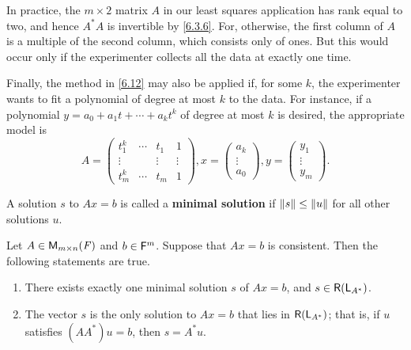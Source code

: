 \begin{note}
  In practice, the \(m \times 2\) matrix \(A\) in our least squares application has rank equal to two, and hence \(A^* A\) is invertible by \cref{6.3.6}.
  For, otherwise, the first column of \(A\) is a multiple of the second column, which consists only of ones.
  But this would occur only if the experimenter collects all the data at exactly one time.

  Finally, the method in \cref{6.12} may also be applied if, for some \(k\), the experimenter wants to fit a polynomial of degree at most \(k\) to the data.
  For instance, if a polynomial \(y = a_0 + a_1 t + \cdots + a_k t^k\) of degree at most \(k\) is desired, the appropriate model is
  \[
    A = \begin{pmatrix}
      t_1^k  & \cdots & t_1    & 1      \\
      \vdots &        & \vdots & \vdots \\
      t_m^k  & \cdots & t_m    & 1
    \end{pmatrix}, x = \begin{pmatrix}
      a_k    \\
      \vdots \\
      a_0
    \end{pmatrix}, y = \begin{pmatrix}
      y_1    \\
      \vdots \\
      y_m
    \end{pmatrix}.
  \]
\end{note}

\begin{defn}\label{6.3.7}
  A solution \(s\) to \(Ax = b\) is called a \textbf{minimal solution} if \(\left\lVert s\right\rVert \leq \left\lVert u\right\rVert\) for all other solutions \(u\).
\end{defn}

\begin{thm}\label{6.13}
  Let \(A \in \ms\) and \(b \in \mathsf{F}^m\).
  Suppose that \(Ax = b\) is consistent.
  Then the following statements are true.
  \begin{enumerate}
    \item There exists exactly one minimal solution \(s\) of \(Ax = b\), and \(s \in \rg{\L_{A^*}}\).
    \item The vector \(s\) is the only solution to \(Ax = b\) that lies in \(\rg{\L_{A^*}}\);
          that is, if \(u\) satisfies \((A A^*) u = b\), then \(s = A^* u\).
  \end{enumerate}
\end{thm}

